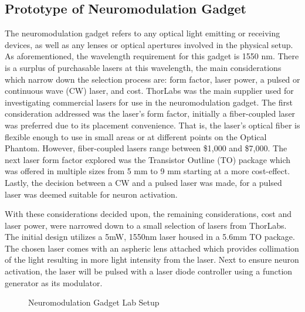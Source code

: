 \documentclass[journal,twoside,web]{ieeecolor}
\begin{document}
\subsection{Prototype of Neuromodulation Gadget}
The neuromodulation gadget refers to any optical light emitting or receiving devices, as well as any lenses or optical apertures involved in the physical setup. As aforementioned, the wavelength requirement for this gadget is 1550 nm. There is a surplus of purchasable lasers at this wavelength, the main considerations which narrow down the selection process are: form factor, laser power, a pulsed or continuous wave (CW) laser, and cost. ThorLabs was the main supplier used for investigating commercial lasers for use in the neuromodulation gadget. The first consideration addressed was the laser’s form factor, initially a fiber-coupled laser was preferred due to its placement convenience. That is, the laser’s optical fiber is flexible enough to use in small areas or at different points on the Optical Phantom. However, fiber-coupled lasers range between \$1,000 and \$7,000. The next laser form factor explored was the Transistor Outline (TO) package which was offered in multiple sizes from 5 mm to 9 mm starting at a more cost-effect. Lastly, the decision between a CW and a pulsed laser was made, for a pulsed laser was deemed suitable for neuron activation.  

With these considerations decided upon, the remaining considerations, cost and laser power, were narrowed down to a small selection of lasers from ThorLabs. The initial design utilizes a 5mW, 1550nm laser housed in a 5.6mm TO package. The chosen laser comes with an aspheric lens attached which provides collimation of the light resulting in more light intensity from the laser. Next to ensure neuron activation, the laser will be pulsed with a laser diode controller using a function generator as its modulator. 

\begin{figure}[hbt]
    \caption{\label{fig:LaserSetup} Neuromodulation Gadget Lab Setup}
\end{figure}
\end{document}
